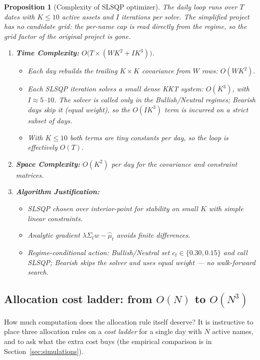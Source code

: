 \documentclass[a4paper,12pt]{article}
\newtheorem{proposition}{Proposition}[section]
\begin{document}
\begin{proposition}[Complexity of SLSQP optimizer]
The daily loop runs over $T$ dates with $K\le 10$ active assets and $I$ iterations per solve. The simplified project has \emph{no} candidate grid: the per-name cap is read directly from the regime, so the grid factor of the original project is gone.
\begin{enumerate}[label=(\roman*)]
    \item \textbf{Time Complexity:} $O\!\big(T \times (W K^2 + I K^3)\big)$.
    \begin{itemize}
        \item Each day rebuilds the trailing $K\times K$ covariance from $W$ rows: $O(W K^2)$.
        \item Each SLSQP iteration solves a small dense KKT system: $O(K^3)$, with $I\approx 5$--$10$. The solver is called only in the Bullish/Neutral regimes; Bearish days skip it (equal weight), so the $O(IK^3)$ term is incurred on a strict subset of days.
        \item With $K\le 10$ both terms are tiny constants per day, so the loop is effectively $O(T)$.
    \end{itemize}
    \item \textbf{Space Complexity:} $O(K^2)$ per day for the covariance and constraint matrices.
    \item \textbf{Algorithm Justification:}
    \begin{itemize}
        \item SLSQP chosen over interior-point for stability on small $K$ with simple linear constraints.
        \item Analytic gradient $\lambda\Sigma_t w-\widehat\mu_t$ avoids finite differences.
        \item Regime-conditional action: Bullish/Neutral set $c_t\in\{0.30,0.15\}$ and call SLSQP; Bearish skips the solver and uses equal weight --- no walk-forward search.
    \end{itemize}
\end{enumerate}
\end{proposition}

\subsection{Allocation cost ladder: from $O(N)$ to $O(N^3)$}
\label{sec:naive}

How much computation does the allocation rule itself deserve? It is instructive to place three allocation rules on a \emph{cost ladder} for a single day with $N$ active names, and to ask what the extra cost buys (the empirical comparison is in Section~\ref{sec:simulations}).
\end{document}
